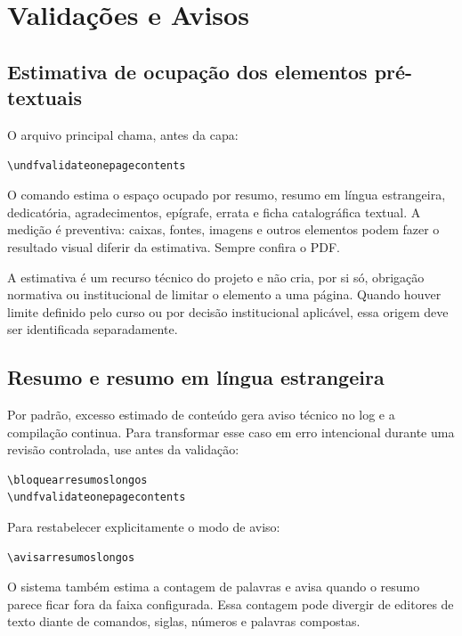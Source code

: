 \chapter{Validações e Avisos}

\section{Estimativa de ocupação dos elementos pré-textuais}

O arquivo principal chama, antes da capa:

\begin{lstlisting}
\undfvalidateonepagecontents
\end{lstlisting}

O comando estima o espaço ocupado por resumo, resumo em língua estrangeira, dedicatória, agradecimentos, epígrafe, errata e ficha catalográfica textual. A medição é preventiva: caixas, fontes, imagens e outros elementos podem fazer o resultado visual diferir da estimativa. Sempre confira o PDF.

A estimativa é um recurso técnico do projeto e não cria, por si só, obrigação normativa ou institucional de limitar o elemento a uma página. Quando houver limite definido pelo curso ou por decisão institucional aplicável, essa origem deve ser identificada separadamente.

\section{Resumo e resumo em língua estrangeira}

Por padrão, excesso estimado de conteúdo gera aviso técnico no log e a compilação continua. Para transformar esse caso em erro intencional durante uma revisão controlada, use antes da validação:

\begin{lstlisting}
\bloquearresumoslongos
\undfvalidateonepagecontents
\end{lstlisting}

Para restabelecer explicitamente o modo de aviso:

\begin{lstlisting}
\avisarresumoslongos
\end{lstlisting}

O sistema também estima a contagem de palavras e avisa quando o resumo parece ficar fora da faixa configurada. Essa contagem pode divergir de editores de texto diante de comandos, siglas, números e palavras compostas.

